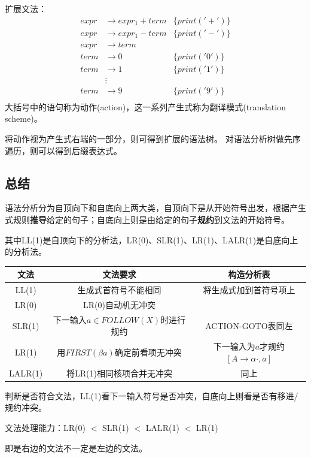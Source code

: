 扩展文法：
\[\begin{array}{rll}
expr &\to expr_1 + term & \{print('+')\}\\
expr &\to expr_1 - term & \{print('-')\}\\
expr &\to term & \\
term &\to 0    & \{print('0')\}\\
term &\to 1    & \{print('1')\}\\
     &\vdots   & \\
term &\to 9    & \{print('9')\}\\
\end{array}\]
大括号中的语句称为动作(action)，这一系列产生式称为翻译模式(translation scheme)。

将动作视为产生式右端的一部分，则可得到扩展的语法树。
对语法分析树做先序遍历，则可以得到后缀表达式。

\subsection{总结}
语法分析分为自顶向下和自底向上两大类，自顶向下是从开始符号出发，根据产生式规则\textbf{推导}给定的句子；自底向上则是由给定的句子\textbf{规约}到文法的开始符号。

其中LL(1)是自顶向下的分析法，LR(0)、SLR(1)、LR(1)、LALR(1)是自底向上的分析法。
\begin{center}
\begin{tabular}{|c|c|c|}\hline
文法 & 文法要求 & 构造分析表 \\\hline
LL(1) & 生成式首符号不能相同 & 将生成式加到首符号项上\\\hline
LR(0) & LR(0)自动机无冲突 & \\\hline
SLR(1) & 下一输入$a\in FOLLOW(X)$时进行规约 & ACTION-GOTO表同左\\\hline
LR(1) & 用$FIRST(\beta a)$确定前看项无冲突 & 下一输入为$a$才规约$[A\to\alpha\cdot,a]$\\\hline
LALR(1) & 将LR(1)相同核项合并无冲突 & 同上\\\hline
\end{tabular}
\end{center}

判断是否符合文法，LL(1)看下一输入符号是否冲突，自底向上则看是否有移进/规约冲突。


文法处理能力：LR(0) $<$ SLR(1) $<$ LALR(1) $<$ LR(1)

即是右边的文法不一定是左边的文法。
